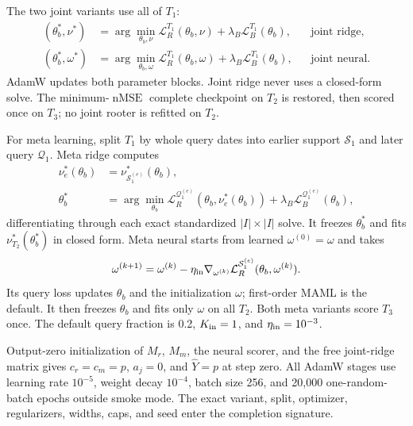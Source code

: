 \documentclass[10pt]{article}
\newcommand{\Tone}{T_1}
\newcommand{\Ttwo}{T_2}
\newcommand{\Tthree}{T_3}
\newcommand{\nMSE}{\operatorname{nMSE}}
\begin{document}
The two joint variants use all of $\Tone$:
\begin{align}
 (\theta_b^*,\nu^*)&=\arg\min_{\theta_b,\nu}
 \mathcal L_R^{\Tone}(\theta_b,\nu)+\lambda_B\mathcal L_B^{\Tone}(\theta_b),
 &&\text{joint ridge},\\
 (\theta_b^*,\omega^*)&=\arg\min_{\theta_b,\omega}
 \mathcal L_R^{\Tone}(\theta_b,\omega)+\lambda_B\mathcal L_B^{\Tone}(\theta_b),
 &&\text{joint neural}.
\end{align}
AdamW updates both parameter blocks. Joint ridge never uses a closed-form solve.
The minimum-$\nMSE$ complete checkpoint on $\Ttwo$ is restored, then scored once
on $\Tthree$; no joint rooter is refitted on $\Ttwo$.

For meta learning, split $\Tone$ by whole query dates into earlier support
$\mathcal S_1$ and later query $\mathcal Q_1$. Meta ridge computes
\begin{align}
 \nu_e^*(\theta_b)&=\nu^*_{\mathcal S_1^{(e)}}(\theta_b),\\
 \theta_b^*&=\arg\min_{\theta_b}
 \mathcal L_R^{\mathcal Q_1^{(e)}}(\theta_b,\nu_e^*(\theta_b))
 +\lambda_B\mathcal L_B^{\mathcal Q_1^{(e)}}(\theta_b),
\end{align}
differentiating through each exact standardized $|I|\times|I|$ solve. It freezes
$\theta_b^*$ and fits $\nu^*_{\Ttwo}(\theta_b^*)$ in closed form.
Meta neural starts from learned $\omega^{(0)}=\omega$ and takes
\[
 \omega^{(k+1)}=\omega^{(k)}-\eta_{\rm in}
 \nabla_{\omega^{(k)}}\mathcal L_R^{\mathcal S_1^{(e)}}
 (\theta_b,\omega^{(k)}).
\]
Its query loss updates $\theta_b$ and the initialization $\omega$; first-order
MAML is the default. It then freezes $\theta_b$ and fits only $\omega$ on all
$\Ttwo$. Both meta variants score $\Tthree$ once. The default query fraction is
0.2, $K_{\rm in}=1$, and $\eta_{\rm in}=10^{-3}$.

Output-zero initialization of $M_r$, $M_m$, the neural scorer, and the free
joint-ridge matrix gives $c_r=c_m=p$, $a_j=0$, and $\widehat Y=p$ at step zero.
All AdamW stages use learning rate $10^{-5}$, weight decay $10^{-4}$, batch size
256, and 20,000 one-random-batch epochs outside smoke mode. The exact variant,
split, optimizer, regularizers, widths, caps, and seed enter the completion
signature.
\end{document}
